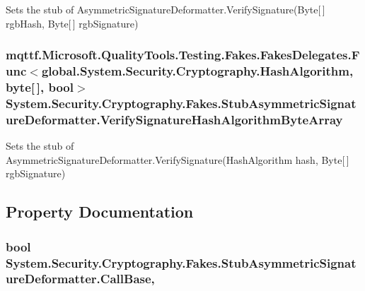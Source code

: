 Sets the stub of Asymmetric\-Signature\-Deformatter.\-Verify\-Signature(\-Byte\mbox{[}$\,$\mbox{]} rgb\-Hash, Byte\mbox{[}$\,$\mbox{]} rgb\-Signature)

\hypertarget{class_system_1_1_security_1_1_cryptography_1_1_fakes_1_1_stub_asymmetric_signature_deformatter_ab73714f51a7d63d7948d299f5d416e42}{
\subsubsection[{Verify\-Signature\-Hash\-Algorithm\-Byte\-Array}]{\setlength{\rightskip}{0pt plus 5cm}mqttf.\-Microsoft.\-Quality\-Tools.\-Testing.\-Fakes.\-Fakes\-Delegates.\-Func$<$global.\-System.\-Security.\-Cryptography.\-Hash\-Algorithm, byte\mbox{[}$\,$\mbox{]}, bool$>$ System.\-Security.\-Cryptography.\-Fakes.\-Stub\-Asymmetric\-Signature\-Deformatter.\-Verify\-Signature\-Hash\-Algorithm\-Byte\-Array}}\label{class_system_1_1_security_1_1_cryptography_1_1_fakes_1_1_stub_asymmetric_signature_deformatter_ab73714f51a7d63d7948d299f5d416e42}


Sets the stub of Asymmetric\-Signature\-Deformatter.\-Verify\-Signature(\-Hash\-Algorithm hash, Byte\mbox{[}$\,$\mbox{]} rgb\-Signature)



\subsection{Property Documentation}
\hypertarget{class_system_1_1_security_1_1_cryptography_1_1_fakes_1_1_stub_asymmetric_signature_deformatter_a3f5f2b328050d1e948424f6ef15cdc9c}{
\subsubsection[{Call\-Base}]{\setlength{\rightskip}{0pt plus 5cm}bool System.\-Security.\-Cryptography.\-Fakes.\-Stub\-Asymmetric\-Signature\-Deformatter.\-Call\-Base\hspace{0.3cm}{\ttfamily [get]}, {\ttfamily [set]}}}\label{class_system_1_1_security_1_1_cryptography_1_1_fakes_1_1_stub_asymmetric_signature_deformatter_a3f5f2b328050d1e948424f6ef15cdc9c}


